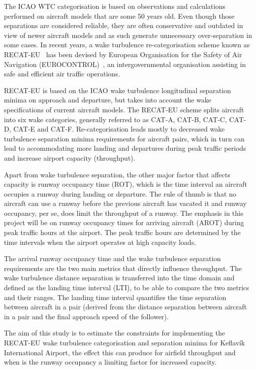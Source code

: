 The ICAO WTC categorisation is based on observations and calculations performed on aircraft models that are some 50 years old. Even though those separations are considered reliable, they are often conservative and outdated in view of newer aircraft models and as such generate unnecessary over-separation in some cases.
In recent years, a wake turbulence re-categorisation scheme known as RECAT-EU~\cite{rooseleer2015recat} has been devised by European Organisation for the Safety of Air Navigation (EUROCONTROL)~\cite{EUROCONTROL_recat_eu}, an intergovernmental organisation assisting in safe and efficient air traffic operations. 

RECAT-EU is based on the ICAO wake turbulence longitudinal separation minima on approach and departure, but takes into account the wake specifications of current aircraft models. The RECAT-EU scheme splits aircraft into six wake categories, generally referred to as CAT-A, CAT-B, CAT-C, CAT-D, CAT-E and CAT-F. Re-categorisation leads mostly to decreased wake turbulence separation minima requirements for aircraft pairs, which in turn can lead to accommodating more landing and departures during peak traffic periods and increase airport capacity (throughput).

Apart from wake turbulence separation, the other major factor that affects capacity is runway occupancy time (ROT), which is the time interval an aircraft occupies a runway during landing or departure. The rule of thumb is that no aircraft can use a runway before the previous aircraft has vacated it and runway occupancy, per se, does limit the throughput of a runway. The emphasis in this project will be on runway occupancy times for arriving aircraft (AROT) during peak traffic hours at the airport. The peak traffic hours are determined by the time intervals when the airport operates at high capacity loads.

The arrival runway occupancy time and the wake turbulence separation requirements are the two main metrics that directly influence throughput. The wake turbulence distance separation is transferred into the time domain and defined as the landing time interval (LTI), to be able to compare the two metrics and their ranges. The landing time interval quantifies the time separation between aircraft in a pair (derived from the distance separation between aircraft in a pair and the final approach speed of the follower). 

The aim of this study is to estimate the constraints for implementing the RECAT-EU wake turbulence categorisation and separation minima for Keflavík International Airport, the effect this can produce for airfield throughput and when is the runway occupancy a limiting factor for increased capacity.

